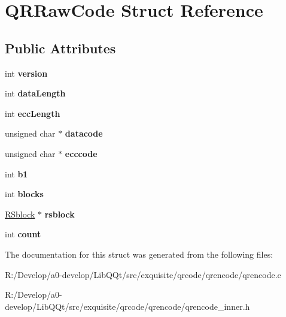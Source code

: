 \hypertarget{struct_q_r_raw_code}{}\section{Q\+R\+Raw\+Code Struct Reference}
\label{struct_q_r_raw_code}
\subsection*{Public Attributes}
\begin{DoxyCompactItemize}
\item 
\mbox{\label{struct_q_r_raw_code_af941c8114b377a9058569aa9c2ba5a27}} 
int {\bfseries version}
\item 
\mbox{\label{struct_q_r_raw_code_a974ee31e3402e24f179578adf2abb29c}} 
int {\bfseries data\+Length}
\item 
\mbox{\label{struct_q_r_raw_code_ae0e17d8f436e7bcb3fac935fa8787895}} 
int {\bfseries ecc\+Length}
\item 
\mbox{\label{struct_q_r_raw_code_abc8e77754d012aed3e1f30bb11e06517}} 
unsigned char $\ast$ {\bfseries datacode}
\item 
\mbox{\label{struct_q_r_raw_code_aa139ac1c46623ef22f4889ad5391eedf}} 
unsigned char $\ast$ {\bfseries ecccode}
\item 
\mbox{\label{struct_q_r_raw_code_a3ffd48c9f259e9dc84bdf05ae4fc495e}} 
int {\bfseries b1}
\item 
\mbox{\label{struct_q_r_raw_code_acc46d472ecc1cc9236ed1397b57ba3ab}} 
int {\bfseries blocks}
\item 
\mbox{\label{struct_q_r_raw_code_adc7c0ec5f88655e6c0aeb3ad9422fbe5}} 
\mbox{\hyperlink{struct_r_sblock}{R\+Sblock}} $\ast$ {\bfseries rsblock}
\item 
\mbox{\label{struct_q_r_raw_code_af745fb65c519dd55404d9f8df1b8db99}} 
int {\bfseries count}
\end{DoxyCompactItemize}


The documentation for this struct was generated from the following files\+:\begin{DoxyCompactItemize}
\item 
R\+:/\+Develop/a0-\/develop/\+Lib\+Q\+Qt/src/exquisite/qrcode/qrencode/qrencode.\+c\item 
R\+:/\+Develop/a0-\/develop/\+Lib\+Q\+Qt/src/exquisite/qrcode/qrencode/qrencode\+\_\+inner.\+h\end{DoxyCompactItemize}
